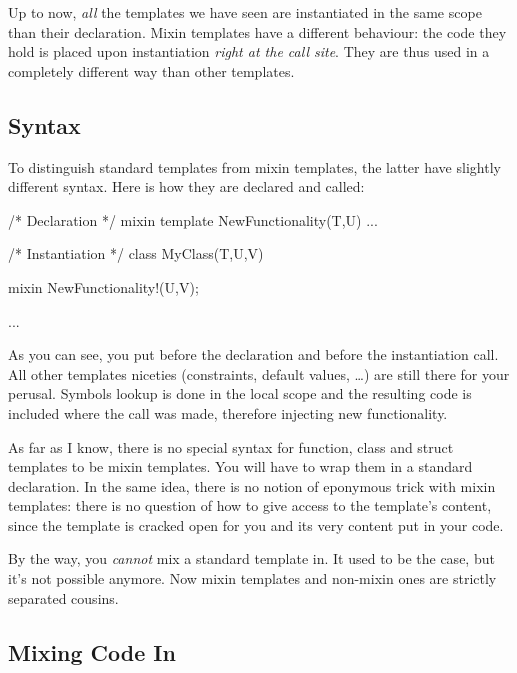 Up to now, \emph{all} the templates we have seen are instantiated in the same scope than their declaration. Mixin templates have a different behaviour: the code they hold is placed upon instantiation \emph{right at the call site}. They are thus used in a completely different way than other templates.

\subsection{Syntax}\label{mixintemplatessyntax}

To distinguish standard templates from mixin templates, the latter have slightly different syntax. Here is how they are declared and called:

\begin{dcode}
/* Declaration */
mixin template NewFunctionality(T,U) { ... }


/* Instantiation */
class MyClass(T,U,V)
{
    mixin NewFunctionality!(U,V);

    ...
}
\end{dcode}

As you can see, you put  before the declaration and  before the instantiation call. All other templates niceties (constraints, default values, \ldots) are still there for your perusal. Symbols lookup is done in the local scope and the resulting code is included where the call was made, therefore injecting new functionality.

As far as I know, there is no special syntax for function, class and struct templates to be mixin templates. You will have to wrap them in a standard  declaration. In the same idea, there is no notion of eponymous trick with mixin templates: there is no question of how to give access to the template's content, since the template is cracked open for you and its very content put in your code.


By the way, you \emph{cannot} mix a standard template in. It used to be the case, but it's not possible anymore. Now mixin templates and non-mixin ones are strictly separated cousins.

\subsection{Mixing Code In}\label{mixincodein}

